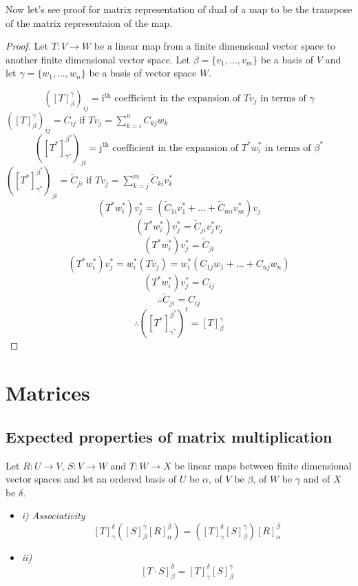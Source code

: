 \documentclass[11pt,a4paper]{colorart}
\def\l{\left}
\def\r{\right}
\def\a{\alpha}
\def\b{\beta}
\def\g{\gamma}
\begin{document}
Now let's see proof for matrix representation of dual of a map to be the transpose of the matrix representaion of the map.

\begin{proof}

	Let $T:V\rightarrow W$ be a linear map from a finite dimensional vector space to another finite dimensional vector space. Let $\b = \{v_1,\dots,v_m\}$ be a basis of $V$ and let $\g = \{w_1,\dots,w_n\}$ be a basis of vector space $W$.

	\[ \l(\l[T\r]_\b^\g\r)_{ij} = \text{i$^\text{th}$ coefficient in the expansion of $Tv_j$ in terms of $\g$} \]
	$ \l(\l[T\r]_\b^\g\r)_{ij} = C_{ij}$ if $Tv_j = \sum_{k=i}^nC_{kj}w_k$
	\[ \l(\l[T^*\r]_{\g^*}^{\b^*}\r)_{ji} = \text{j$^\text{th}$ coefficient in the expansion of $T^*w^*_i$ in terms of $\b^*$} \]
	$ \l(\l[T^*\r]_{\g^*}^{\b^*}\r)_{ji} = \widetilde{C}_{ji}$ if $Tv_j = \sum_{k=j}^m\widetilde{C}_{ki}v^*_k$
	\[ \l(T^*w^*_i\r) v^*_j= \l(\widetilde{C}_{1i} v^*_1 + \dots + \widetilde{C}_{mi}v^*_m\r) v_j \]
	\[ \l(T^*w^*_i\r) v^*_j= \widetilde{C}_{ji} v^*_j v_j \]
	\[ \l(T^*w^*_i\r) v^*_j= \widetilde{C}_{ji} \]
	\[ \l(T^*w^*_i\r) v^*_j= w^*_i \l(Tv_j\r) = w^*_i \l( C_{1j} w_1 + \dots + C_{nj} w_n \r)  \]
	\[ \l(T^*w^*_i\r) v^*_j= C_{ij} \]
	\[ \therefore \widetilde{C}_{ji} = C_{ij} \]
	\[ \therefore \l(\l[T^*\r]_{\g^*}^{\b^*}\r)^t = \l[T\r]_\b^\g\]
\end{proof}


\section{Matrices}

\subsection{Expected properties of matrix multiplication}

Let $R:U\rightarrow V$, $S:V\rightarrow W$ and $T:W\rightarrow X$ be linear maps between finite dimensional vector spaces and let an ordered basis of $U$ be $\a$, of $V$ be $\b$, of $W$ be $\g$ and of $X$ be $\delta$.


\begin{itemize}

	\item \textit{i) Associativity} 
		\[ \l[T\r]_\g^\delta\l(\l[S\r]^\g_\b\l[R\r]^\b_\a \r) = \l(\l[T\r]_\g^\delta \l[S\r]^\g_\b \r) \l[R\r]^\b_\a  \]
	
	\item \textit{ii)}
		\[ \l[T\cdot S\r]^\delta_\b  = \l[T\r]_\g^\delta \l[S\r]^\g_\b  \]


\end{itemize}
\end{document}
